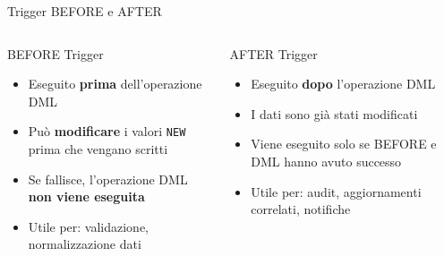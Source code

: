 \documentclass[aspectratio=169]{beamer}
\begin{document}
\begin{frame}{Trigger BEFORE e AFTER}
  \begin{columns}[T]
      \begin{block}{BEFORE Trigger}
        \begin{itemize}
          \item Eseguito \textbf{prima} dell'operazione DML
          \item Può \textbf{modificare} i valori \texttt{NEW} prima che vengano scritti
          \item Se fallisce, l'operazione DML \textbf{non viene eseguita}
          \item Utile per: validazione, normalizzazione dati
        \end{itemize}
      \end{block}
      \begin{alertblock}{AFTER Trigger}
        \begin{itemize}
          \item Eseguito \textbf{dopo} l'operazione DML
          \item I dati sono già stati modificati
          \item Viene eseguito solo se BEFORE e DML hanno avuto successo
          \item Utile per: audit, aggiornamenti correlati, notifiche
        \end{itemize}
      \end{alertblock}
  \end{columns}
  \vspace{0.5cm}
  \begin{center}
  \end{center}
\end{frame}
\end{document}
